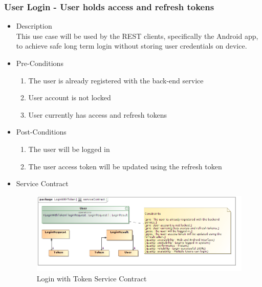 \documentclass[a4paper,10pt]{article}
\begin{document}
\subsubsection{User Login - User holds access and refresh tokens}
	\begin{itemize}
		\item Description\\
		This use case will be used by the REST clients, specifically the Android app, to achieve safe long term login without storing user credentials on device. 
		\item Pre-Conditions
			\begin{enumerate}
				\item The user is already registered with the back-end service
				\item User account is not locked
				\item User currently has access and refresh tokens
			\end{enumerate}
		\item Post-Conditions
			\begin{enumerate}
				\item The user will be logged in
				\item The user access token will be updated using the refresh token
			\end{enumerate}
		\item Service Contract
			\begin{figure}[H]
				\includegraphics[scale=0.5]{loginWithToken}
				\caption{Login with Token Service Contract}
			\end{figure}
	\end{itemize}
\end{document}
